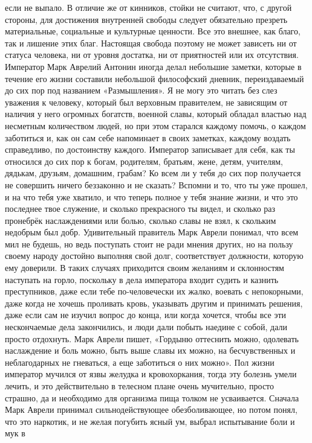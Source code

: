 если не выпало. В отличие же от кинников, стойки не считают, что, с другой
стороны, для достижения внутренней свободы следует обязательно презреть
материальные, социальные и культурные ценности. Все это внешнее, как благо, так
и лишение этих благ. Настоящая свобода поэтому не может зависеть ни от статуса
человека, ни от уровня достатка, ни от приятностей или их отсутствия. Император
Марк Аврелий Антонин иногда делал небольшие заметки, которые в течение его жизни
составили небольшой философский дневник, переиздаваемый до сих пор под названием
«Размышления». Я не могу это читать без слез уважения к человеку, который был
верховным правителем, не зависящим от наличия у него огромных богатств, военной
славы, который обладал властью над несметным количеством людей, но при этом
старался каждому помочь, о каждом заботиться и, как он сам себе напоминает в
своих заметках, каждому воздать справедливо, по достоинству каждого. Император
записывает для себя, как ты относился до сих пор к богам, родителям, братьям,
жене, детям, учителям, дядькам, друзьям, домашним, грабам? Ко всем ли у тебя до
сих пор получается не совершить ничего беззаконно и не сказать? Вспомни и то,
что ты уже прошел, и на что тебя уже хватило, и что теперь полное у тебя знание
жизни, и что это последнее твое служение, и сколько прекрасного ты видел, и
сколько раз пронебрёк наслаждениями или болью, сколько славы не взял, к скольким
недобрым был добр. Удивительный правитель Марк Аврели понимал, что всем мил не
будешь, но ведь поступать стоит не ради мнения других, но на пользу своему
народу достойно выполняя свой долг, соответствует должности, которую ему
доверили. В таких случаях приходится своим желаниям и склонностям наступать на
горло, поскольку в дела императора входит судить и казнить преступников, даже
если тебе по-человечески их жалко, воевать с непокорными, даже когда не хочешь
проливать кровь, указывать другим и принимать решения, даже если сам не изучил
вопрос до конца, или когда хочется, чтобы все эти нескончаемые дела закончились,
и люди дали побыть наедине с собой, дали просто отдохнуть. Марк Аврели пишет,
«Гордыню оттеснить можно, одолевать наслаждение и боль можно, быть выше славы их
можно, на бесчувственных и неблагодарных не гневаться, а еще заботиться о них
можно». Пол жизни император мучился от язвы желудка и кровохоркания, тогда эту
болезнь умели лечить, и это действительно в телесном плане очень мучительно,
просто страшно, да и необходимо для организма пища толком не усваивается.
Сначала Марк Аврели принимал сильнодействующее обезболивающее, но потом понял,
что это наркотик, и не желая погубить ясный ум, выбрал испытывание боли и мук в

